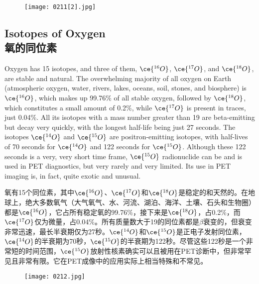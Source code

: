 \documentclass[dvipsnames, svgnames,a4paper,11pt]{article}
\begin{document}
\begin{figure}[h]
	\centering
    \texttt{[image: 0211[2].jpg]} 
     \label{fig263}
\end{figure}


\subsection{Isotopes of Oxygen \\氧的同位素}  
Oxygen has 15 isotopes, and three of them, \(\ce{^{16}O}\), \(\ce{^{17}O}\), and \(\ce{^{18}O}\), are stable and natural. The overwhelming majority of all oxygen on Earth (atmospheric oxygen, water, rivers, lakes, oceans, soil, stones, and biosphere) is \(\ce{^{16}O}\), which makes up 99.76\% of all stable oxygen, followed by \(\ce{^{18}O}\), which constitutes a small amount of 0.2\%, while \(\ce{^{17}O}\) is present in traces, just 0.04\%. All its isotopes with a mass number greater than 19 are beta-emitting but decay very quickly, with the longest half-life being just 27 seconds. The isotopes \(\ce{^{14}O}\) and \(\ce{^{15}O}\) are positron-emitting isotopes, with half-lives of 70 seconds for \(\ce{^{14}O}\) and 122 seconds for \(\ce{^{15}O}\). Although these 122 seconds is a very, very short time frame, \(\ce{^{15}O}\) radionuclide can be and is used in PET diagnostics, but very rarely and very limited. Its use in PET imaging is, in fact, quite exotic and unusual.

氧有15个同位素，其中\(\ce{^{16}O}\)、\(\ce{^{17}O}\)和\(\ce{^{18}O}\)是稳定的和天然的。在地球上，绝大多数氧气（大气氧气、水、河流、湖泊、海洋、土壤、石头和生物圈）都是\(\ce{^{16}O}\)，它占所有稳定氧的99.76\%，接下来是\(\ce{^{18}O}\)，占0.2\%，而\(\ce{^{17}O}\)仅为微量，占0.04\%。所有质量数大于19的同位素都是\(\beta\)衰变的，但衰变非常迅速，最长半衰期仅为27秒。\(\ce{^{14}O}\)和\(\ce{^{15}O}\)是正电子发射同位素，\(\ce{^{14}O}\)的半衰期为70秒，\(\ce{^{15}O}\)的半衰期为122秒。尽管这些122秒是一个非常短的时间范围，\(\ce{^{15}O}\)放射性核素确实可以且被用在PET诊断中，但非常罕见且非常有限。它在PET成像中的应用实际上相当特殊和不常见。

\begin{figure}[h]
	\centering
    \texttt{[image: 0212.jpg]}  
     \label{fig264}
\end{figure}
\end{document}

